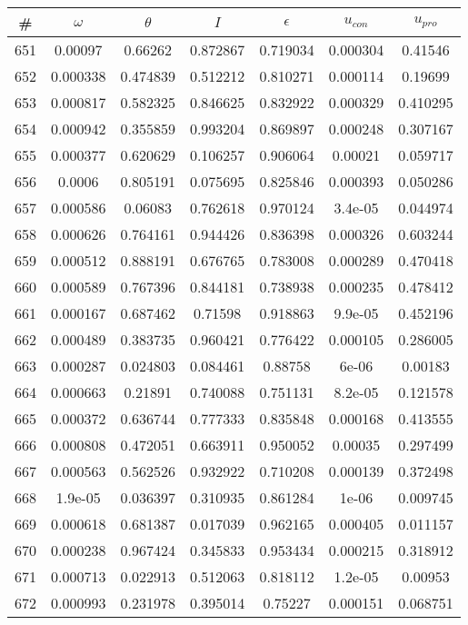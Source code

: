 \newpage
\begin{table}
\begin{tabular}{c|c|c|c|c|c|c}
\# & $\omega$ & $\theta$ & $I$ & $\epsilon$ & $u_{con}$ & $u_{pro}$\\
\hline
651 & 0.00097 & 0.66262 & 0.872867 & 0.719034 & 0.000304 & 0.41546\\
652 & 0.000338 & 0.474839 & 0.512212 & 0.810271 & 0.000114 & 0.19699\\
653 & 0.000817 & 0.582325 & 0.846625 & 0.832922 & 0.000329 & 0.410295\\
654 & 0.000942 & 0.355859 & 0.993204 & 0.869897 & 0.000248 & 0.307167\\
655 & 0.000377 & 0.620629 & 0.106257 & 0.906064 & 0.00021 & 0.059717\\
656 & 0.0006 & 0.805191 & 0.075695 & 0.825846 & 0.000393 & 0.050286\\
657 & 0.000586 & 0.06083 & 0.762618 & 0.970124 & 3.4e-05 & 0.044974\\
658 & 0.000626 & 0.764161 & 0.944426 & 0.836398 & 0.000326 & 0.603244\\
659 & 0.000512 & 0.888191 & 0.676765 & 0.783008 & 0.000289 & 0.470418\\
660 & 0.000589 & 0.767396 & 0.844181 & 0.738938 & 0.000235 & 0.478412\\
661 & 0.000167 & 0.687462 & 0.71598 & 0.918863 & 9.9e-05 & 0.452196\\
662 & 0.000489 & 0.383735 & 0.960421 & 0.776422 & 0.000105 & 0.286005\\
663 & 0.000287 & 0.024803 & 0.084461 & 0.88758 & 6e-06 & 0.00183\\
664 & 0.000663 & 0.21891 & 0.740088 & 0.751131 & 8.2e-05 & 0.121578\\
665 & 0.000372 & 0.636744 & 0.777333 & 0.835848 & 0.000168 & 0.413555\\
666 & 0.000808 & 0.472051 & 0.663911 & 0.950052 & 0.00035 & 0.297499\\
667 & 0.000563 & 0.562526 & 0.932922 & 0.710208 & 0.000139 & 0.372498\\
668 & 1.9e-05 & 0.036397 & 0.310935 & 0.861284 & 1e-06 & 0.009745\\
669 & 0.000618 & 0.681387 & 0.017039 & 0.962165 & 0.000405 & 0.011157\\
670 & 0.000238 & 0.967424 & 0.345833 & 0.953434 & 0.000215 & 0.318912\\
671 & 0.000713 & 0.022913 & 0.512063 & 0.818112 & 1.2e-05 & 0.00953\\
672 & 0.000993 & 0.231978 & 0.395014 & 0.75227 & 0.000151 & 0.068751\\

\end{tabular}
\end{table}
